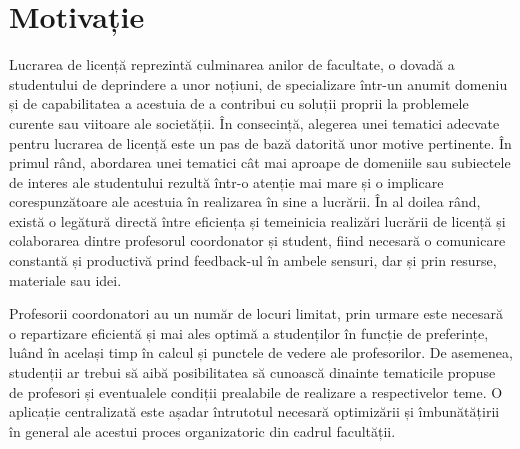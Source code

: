 \chapter*{Motivație} 

Lucrarea de licență reprezintă culminarea anilor de facultate, o dovadă a studentului de deprindere a unor noțiuni, de specializare într-un anumit domeniu și de capabilitatea a acestuia de a contribui cu soluții proprii la problemele curente sau viitoare ale societății. În consecință, alegerea unei tematici adecvate pentru lucrarea de licență este un pas de bază datorită unor motive pertinente.
În primul rând, abordarea unei tematici cât mai aproape de domeniile sau subiectele de interes ale studentului rezultă într-o atenție mai mare și o implicare corespunzătoare ale acestuia în realizarea în sine a lucrării.
În al doilea rând, există o legătură directă între eficiența și temeinicia realizări lucrării de licență și colaborarea dintre profesorul coordonator și student, fiind necesară o comunicare constantă și productivă prind feedback-ul în ambele sensuri, dar și prin resurse, materiale sau idei.

Profesorii coordonatori au un număr de locuri limitat, prin urmare este necesară o repartizare eficientă și mai ales optimă a studenților în funcție de preferințe, luând în același timp în calcul și punctele de vedere ale profesorilor. De asemenea, studenții ar trebui să aibă posibilitatea să cunoască dinainte tematicile propuse de profesori și eventualele condiții prealabile de realizare a respectivelor teme. O aplicație centralizată este așadar întrutotul necesară optimizării și îmbunătățirii în general ale acestui proces organizatoric din cadrul facultății.